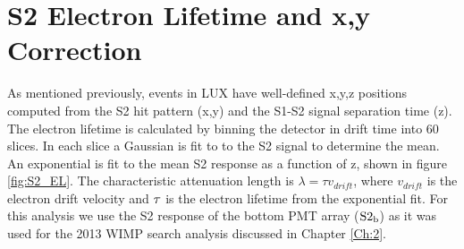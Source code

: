 
\section{S2 Electron Lifetime and x,y Correction}

As mentioned previously, events in LUX have well-defined x,y,z positions computed from the S2 hit pattern (x,y) and the S1-S2 signal separation time (z). The electron lifetime is calculated by binning the detector in drift time into 60 slices. In each slice a Gaussian is fit to to the \KrCal S2 signal to determine the mean. An exponential is fit to the mean S2 response as a function of z, shown in figure \ref{fig:S2_EL}. The characteristic attenuation length is $\lambda = \tau v_{drift}$, where $v_{drift}$ is the electron drift velocity and $\rm \tau$ is the electron lifetime from the exponential fit. For this analysis we use the S2 response of the bottom PMT array ($\rm S2_b$) as it was used for the 2013 WIMP search analysis discussed in Chapter \ref{Ch:2}. %


